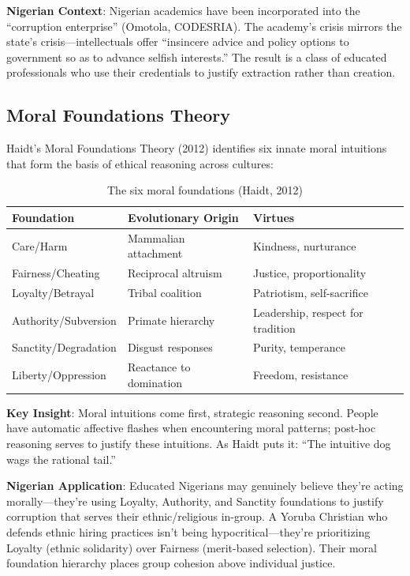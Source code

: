 \documentclass[11pt,a4paper]{article}
\begin{document}
\textbf{Nigerian Context}: Nigerian academics have been incorporated into the ``corruption enterprise'' (Omotola, CODESRIA). The academy's crisis mirrors the state's crisis—intellectuals offer ``insincere advice and policy options to government so as to advance selfish interests.'' The result is a class of educated professionals who use their credentials to justify extraction rather than creation.

\subsection{Moral Foundations Theory}

Haidt's Moral Foundations Theory (2012) identifies six innate moral intuitions that form the basis of ethical reasoning across cultures:

\begin{table}[h]
\centering
\begin{tabular}{lll}
\toprule
\textbf{Foundation} & \textbf{Evolutionary Origin} & \textbf{Virtues} \\
\midrule
Care/Harm & Mammalian attachment & Kindness, nurturance \\
Fairness/Cheating & Reciprocal altruism & Justice, proportionality \\
Loyalty/Betrayal & Tribal coalition & Patriotism, self-sacrifice \\
Authority/Subversion & Primate hierarchy & Leadership, respect for tradition \\
Sanctity/Degradation & Disgust responses & Purity, temperance \\
Liberty/Oppression & Reactance to domination & Freedom, resistance \\
\bottomrule
\end{tabular}
\caption{The six moral foundations (Haidt, 2012)}
\end{table}

\textbf{Key Insight}: Moral intuitions come first, strategic reasoning second. People have automatic affective flashes when encountering moral patterns; post-hoc reasoning serves to justify these intuitions. As Haidt puts it: ``The intuitive dog wags the rational tail.''

\textbf{Nigerian Application}: Educated Nigerians may genuinely believe they're acting morally—they're using Loyalty, Authority, and Sanctity foundations to justify corruption that serves their ethnic/religious in-group. A Yoruba Christian who defends ethnic hiring practices isn't being hypocritical—they're prioritizing Loyalty (ethnic solidarity) over Fairness (merit-based selection). Their moral foundation hierarchy places group cohesion above individual justice.
\end{document}
